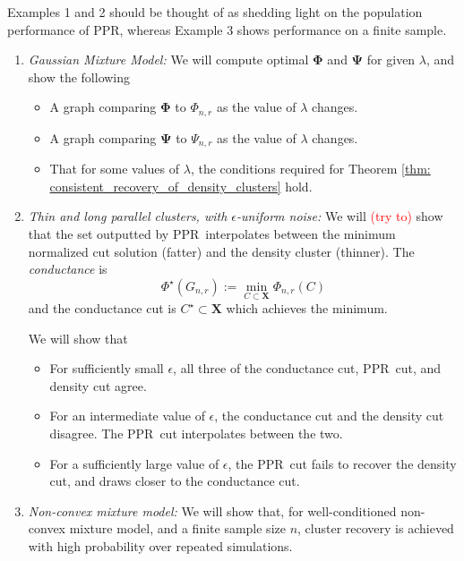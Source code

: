 \documentclass{article}
\newcommand{\1}{\mathbf{1}}
\newcommand{\Phibf}{\mathbf{\Phi}}
\newcommand{\Psibf}{\mathbf{\Psi}}
\newcommand{\Xbf}{\mathbf{X}}
\newcommand{\ppr}{{\sc PPR}}
\newcommand{\pprspace}{{\sc PPR~}}
\theoremstyle{aldenthm}
\theoremstyle{remark}
\begin{document}
Examples 1 and 2 should be thought of as shedding light on the population performance of \ppr, whereas Example 3 shows performance on a finite sample.

\begin{enumerate}
	\item 
	\textit{Gaussian Mixture Model:} 
	We will compute optimal $\Phibf$ and $\Psibf$ for given $\lambda$, and show the following
	\begin{itemize}
		\item A graph comparing $\Phibf$ to $\Phi_{n,r}$ as the value of $\lambda$ changes.
		\item A graph comparing $\Psibf$ to $\Psi_{n,r}$ as the value of $\lambda$ changes.
		\item That for some values of $\lambda$, the conditions required for Theorem \ref{thm: consistent_recovery_of_density_clusters} hold.
	\end{itemize}

	\item
	\textit{Thin and long parallel clusters, with $\epsilon$-uniform noise: }
	We will \textcolor{red}{(try to)} show that the set outputted by \pprspace interpolates between the minimum normalized cut solution (fatter) and the density cluster (thinner). The \emph{conductance} is
	\begin{equation*}
	\Phi^{\star}(G_{n,r}) := \min_{C \subset \Xbf} \Phi_{n,r}(C)
	\end{equation*}
	and the conductance cut is $C^{\star} \subset \Xbf$ which achieves the minimum.
	
	We will show that
	\begin{itemize}
		\item For sufficiently small $\epsilon$, all three of the conductance cut, \pprspace cut, and density cut agree.
		\item For an intermediate value of $\epsilon$, the conductance cut and the density cut disagree. The \pprspace cut interpolates between the two.
		\item For a sufficiently large value of $\epsilon$, the \pprspace cut fails to recover the density cut, and draws closer to the conductance cut.
	\end{itemize}

	\item 
	\textit{Non-convex mixture model:} We will show that, for well-conditioned non-convex mixture model, and a finite sample size $n$, cluster recovery is achieved with high probability over repeated simulations.
\end{enumerate}
\end{document}
